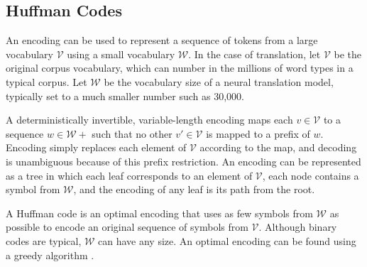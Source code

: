 \subsection{Huffman Codes}

An encoding can be used to represent a sequence of tokens from a large
vocabulary $\mathcal{V}$ using a small vocabulary $\mathcal{W}$.  In the case
of translation, let $\mathcal{V}$ be the original corpus vocabulary, which can
number in the millions of word types in a typical corpus. Let $\mathcal{W}$ be
the vocabulary size of a neural translation model, typically
set to a much smaller number such as 30,000.

A deterministically invertible, variable-length encoding maps each
$v\in\mathcal{V}$ to a sequence $w \in \mathcal{W}+$ such that no other
$v'\in\mathcal{V}$ is mapped to a prefix of $w$. Encoding simply replaces each
element of $\mathcal{V}$ according to the map, and decoding is unambiguous because of this
prefix restriction. An encoding can be represented as a tree in which each leaf
corresponds to an element of $\mathcal{V}$, each node contains a symbol from
$\mathcal{W}$, and the encoding of any leaf is its path from the root.

A Huffman code is an optimal encoding that uses as few symbols from
$\mathcal{W}$ as possible to encode an original sequence of symbols from
$\mathcal{V}$. Although binary codes are typical, $\mathcal{W}$ can have any
size. An optimal encoding can be found using a greedy algorithm
\cite{huffman}.
